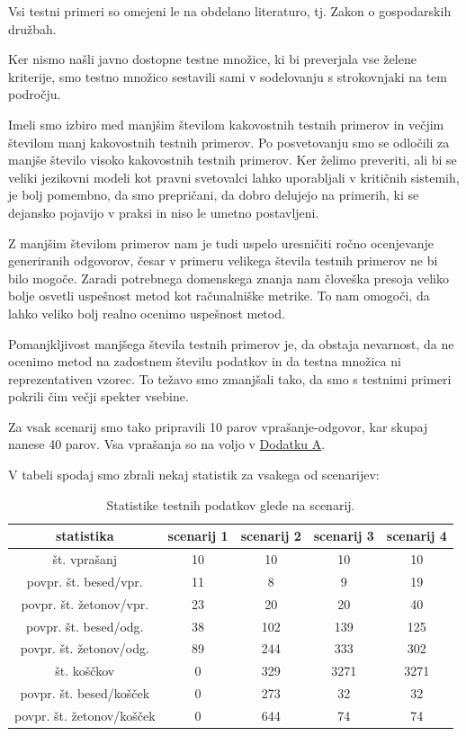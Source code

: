 \documentclass[a4paper,12pt,openright]{book}
\begin{document}
Vsi testni primeri so omejeni le na obdelano literaturo, tj. Zakon o gospodarskih družbah.

Ker nismo našli javno dostopne testne množice, ki bi preverjala vse želene kriterije, smo testno množico sestavili sami v sodelovanju s strokovnjaki na tem področju.

Imeli smo izbiro med manjšim številom kakovostnih testnih primerov in večjim številom manj kakovostnih testnih primerov. Po posvetovanju smo se odločili za manjše število visoko kakovostnih testnih primerov. Ker želimo preveriti, ali bi se veliki jezikovni modeli kot pravni svetovalci lahko uporabljali v kritičnih sistemih, je bolj pomembno, da smo prepričani, da dobro delujejo na primerih, ki se dejansko pojavijo v praksi in niso le umetno postavljeni.

Z manjšim številom primerov nam je tudi uspelo uresničiti ročno ocenjevanje generiranih odgovorov, česar v primeru velikega števila testnih primerov ne bi bilo mogoče. Zaradi potrebnega domenskega znanja nam človeška presoja veliko bolje osvetli uspešnost metod kot računalniške metrike. To nam omogoči, da lahko veliko bolj realno ocenimo uspešnost metod.

Pomanjkljivost manjšega števila testnih primerov je, da obstaja nevarnost, da ne ocenimo metod na zadostnem številu podatkov in da testna množica ni reprezentativen vzorec. To težavo smo zmanjšali tako, da smo s testnimi primeri pokrili čim večji spekter vsebine.

Za vsak scenarij smo tako pripravili 10 parov vprašanje-odgovor, kar skupaj nanese 40 parov. Vsa vprašanja so na voljo v \hyperref[appendix_a]{Dodatku A}.

V tabeli spodaj smo zbrali nekaj statistik za vsakega od scenarijev:

\begin{table}[H]
	\centering
	\caption{Statistike testnih podatkov glede na scenarij.}
	\begin{tabular}{|c|c|c|c|c|}
		\hline
		statistika                & scenarij 1 & scenarij 2 & scenarij 3 & scenarij 4 \\ \hline
		št. vprašanj              & 10         & 10         & 10         & 10         \\ \hline
		povpr. št. besed/vpr.     & 11         & 8          & 9          & 19         \\ \hline
		povpr. št. žetonov/vpr.   & 23         & 20         & 20         & 40         \\ \hline
		povpr. št. besed/odg.     & 38         & 102        & 139        & 125        \\ \hline
		povpr. št. žetonov/odg.   & 89         & 244        & 333        & 302        \\ \hline
		št. koščkov               & 0          & 329        & 3271       & 3271       \\ \hline
		povpr. št. besed/košček   & 0          & 273        & 32         & 32         \\ \hline
		povpr. št. žetonov/košček & 0          & 644        & 74         & 74         \\ \hline
	\end{tabular}
\end{table}
\end{document}
